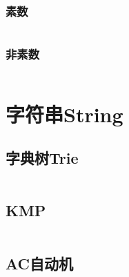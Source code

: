 \documentclass[twoside,sub3section,UTF8]{ctexart}						%
\begin{document}
		\subsubsection{素数}
		\inputminted{c++}{"Maths/CRT(prime).cpp"}
		\subsubsection{非素数}
		\inputminted{c++}{"Maths/CRT(notprime).cpp"}

\section{字符串String}
	\subsection{字典树Trie}
	\inputminted{c++}{"String/Trie.cpp"}
	\subsection{KMP}
	\inputminted{c++}{"String/KMP.cpp"}
	\subsection{AC自动机}
	\inputminted{c++}{"String/AC.cpp"}
	
\end{document}
